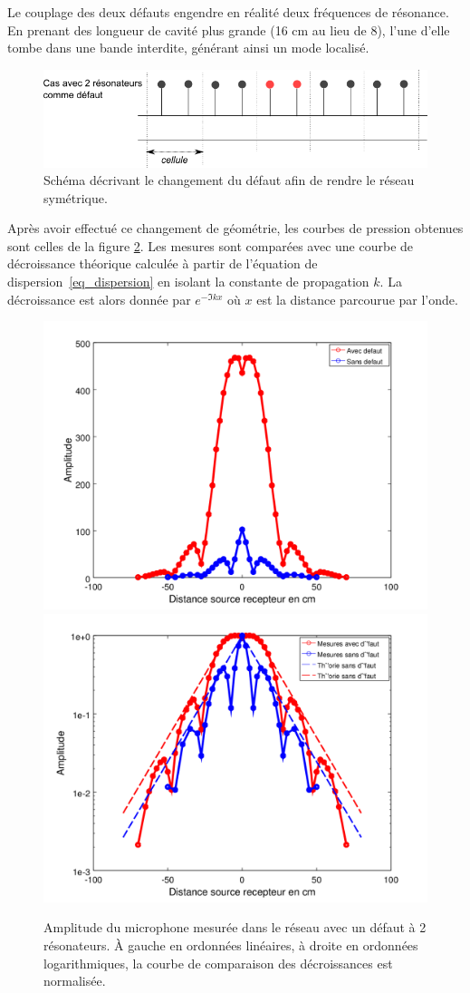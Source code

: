 Le couplage des deux défauts engendre en réalité deux fréquences de résonance. En prenant des longueur de cavité plus grande (16 cm au lieu de 8), l'une d'elle tombe dans une bande interdite, générant ainsi un mode localisé.

\begin{figure}[!h]
\centering
\includegraphics[scale=0.5]{./images_chp3/chgmt_defaut2.png}
\caption{\label{fig_exp} Schéma décrivant le changement du défaut afin de rendre le réseau symétrique.}
\end{figure}



Après avoir effectué ce changement de géométrie, les courbes de pression obtenues sont celles de la figure \ref{p_tube2}.
Les mesures sont comparées avec une courbe de décroissance théorique calculée à partir de l'équation de dispersion~\ref{eq_dispersion} en isolant la constante de propagation $k$. La décroissance est alors donnée par $e^{-\Im{k}x}$ où $x$ est la distance parcourue par l'onde.

\begin{figure}[!h]
\centering
\includegraphics[width=0.5 \textwidth]{./images_chp3/comparaison_decroissance_lin.png}\hfill
\includegraphics[width=0.5 \textwidth]{./images_chp3/comparaison_decroissance_log_theo.png}
\caption{\label{p_tube2} Amplitude du microphone mesurée dans le réseau avec un défaut à 2 résonateurs. À gauche en ordonnées linéaires, à droite en ordonnées logarithmiques, la courbe de comparaison des décroissances est normalisée.}
\end{figure}

